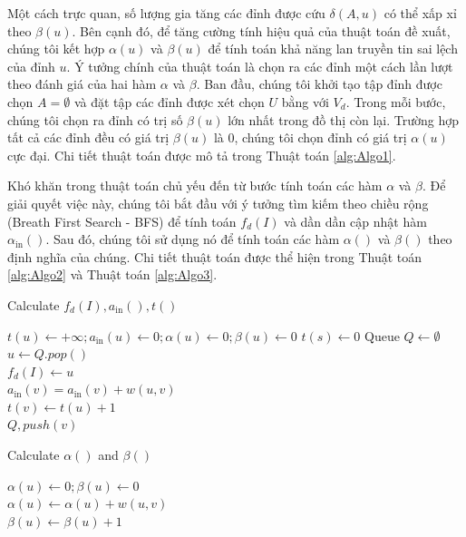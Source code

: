 Một cách trực quan, số lượng gia tăng các đỉnh được cứu $\delta(A, u)$ có thể xấp xỉ theo $\beta(u)$. Bên cạnh đó, để tăng cường tính hiệu quả của thuật toán đề xuất, chúng tôi kết hợp $\alpha(u)$ và $\beta(u)$ để tính toán khả năng lan truyền tin sai lệch của đỉnh $u$. Ý tưởng chính của thuật toán là chọn ra các đỉnh một cách lần lượt theo đánh giá của hai hàm $\alpha$ và $\beta$. Ban đầu, chúng tôi khởi tạo tập đỉnh được chọn $A=\emptyset$ và đặt tập các đỉnh được xét chọn $U$ bằng với $V_{d}$. Trong mỗi bước, chúng tôi chọn ra đỉnh có trị số $\beta(u)$ lớn nhất trong đồ thị còn lại. Trường hợp tất cả các đỉnh đều có giá trị $\beta(u)$ là 0, chúng tôi chọn đỉnh có giá trị $\alpha(u)$ cực đại. Chi tiết thuật toán được mô tả trong Thuật toán \ref{alg:Algo1}.

Khó khăn trong thuật toán chủ yếu đến từ bước tính toán các hàm $\alpha$ và $\beta$. Để giải quyết việc này, chúng tôi bắt đầu với ý tưởng tìm kiếm theo chiều rộng (Breath First Search - BFS) để tính toán $f_{d}(I)$ và dần dần cập nhật hàm $\alpha_{\text{in}}()$. Sau đó, chúng tôi sử dụng nó để tính toán các hàm  $\alpha()$ và $\beta()$ theo định nghĩa của chúng. Chi tiết thuật toán được thể hiện trong Thuật toán \ref{alg:Algo2} và Thuật toán \ref{alg:Algo3}.
\begin{algorithm}[hpt]
	\caption{Calculate $f_{d}(I), a_{\text{in}}(), t()$}
	\label{alg:Algo2}
	{
		$t(u) \gets +\infty; a_{\text{in}}(u) \gets 0; \alpha(u) \gets 0; \beta(u) \gets 0$
	}
	{
		$t(s) \gets 0$
	} 
	Queue $Q \gets \emptyset$
	\\
	{
		$u \gets Q.pop()$
		\\
		$f_{d}(I) \gets u$
		\\
		{
			{
				{
					$a_{\text{in}}(v)=a_{\text{in}}(v)+w(u,v)$
					\\
					{
						$t(v) \gets t(u)+1$
						\\
						$Q,push(v)$
					}
				}
			}
		}	
	}
\end{algorithm}

\begin{algorithm}[hpt]
	\caption{Calculate $\alpha()$ and $\beta()$}
	\label{alg:Algo3}
	{
		$\alpha(u) \gets 0; \beta(u) \gets 0$
		\\
		{
			{
				$\alpha(u) \gets \alpha(u)+w(u,v)$
				\\
				{
					$\beta(u) \gets \beta(u)+1$
				}
			}
		}
	}
\end{algorithm}

